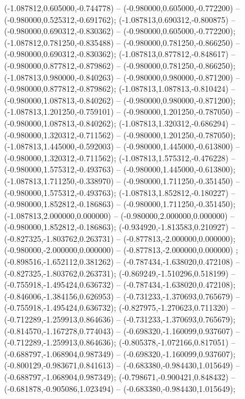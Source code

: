  (-1.087812,0.605000,-0.744778) -- (-0.980000,0.605000,-0.772200) -- (-0.980000,0.525312,-0.691762);
 (-1.087813,0.690312,-0.800875) -- (-0.980000,0.690312,-0.830362) -- (-0.980000,0.605000,-0.772200);
 (-1.087812,0.781250,-0.835488) -- (-0.980000,0.781250,-0.866250) -- (-0.980000,0.690312,-0.830362);
 (-1.087813,0.877812,-0.848617) -- (-0.980000,0.877812,-0.879862) -- (-0.980000,0.781250,-0.866250);
 (-1.087813,0.980000,-0.840263) -- (-0.980000,0.980000,-0.871200) -- (-0.980000,0.877812,-0.879862);
 (-1.087813,1.087813,-0.810424) -- (-0.980000,1.087813,-0.840262) -- (-0.980000,0.980000,-0.871200);
 (-1.087813,1.201250,-0.759101) -- (-0.980000,1.201250,-0.787050) -- (-0.980000,1.087813,-0.840262);
 (-1.087813,1.320312,-0.686294) -- (-0.980000,1.320312,-0.711562) -- (-0.980000,1.201250,-0.787050);
 (-1.087813,1.445000,-0.592003) -- (-0.980000,1.445000,-0.613800) -- (-0.980000,1.320312,-0.711562);
 (-1.087813,1.575312,-0.476228) -- (-0.980000,1.575312,-0.493763) -- (-0.980000,1.445000,-0.613800);
 (-1.087813,1.711250,-0.338970) -- (-0.980000,1.711250,-0.351450) -- (-0.980000,1.575312,-0.493763);
 (-1.087813,1.852812,-0.180227) -- (-0.980000,1.852812,-0.186863) -- (-0.980000,1.711250,-0.351450);
 (-1.087813,2.000000,0.000000) -- (-0.980000,2.000000,0.000000) -- (-0.980000,1.852812,-0.186863);
 (-0.934920,-1.813583,0.210927) -- (-0.827325,-1.803762,0.263731) -- (-0.877813,-2.000000,0.000000);
 (-0.980000,-2.000000,0.000000) -- (-0.877813,-2.000000,0.000000) ;
 (-0.898516,-1.652112,0.381262) -- (-0.787434,-1.638020,0.472108) -- (-0.827325,-1.803762,0.263731);
 (-0.869249,-1.510296,0.518199) -- (-0.755918,-1.495424,0.636732) -- (-0.787434,-1.638020,0.472108);
 (-0.846006,-1.384156,0.626953) -- (-0.731233,-1.370693,0.765679) -- (-0.755918,-1.495424,0.636732);
 (-0.827975,-1.270623,0.711320) -- (-0.712289,-1.259913,0.864636) -- (-0.731233,-1.370693,0.765679);
 (-0.814570,-1.167278,0.774043) -- (-0.698320,-1.160099,0.937607) -- (-0.712289,-1.259913,0.864636);
 (-0.805378,-1.072166,0.817051) -- (-0.688797,-1.068904,0.987349) -- (-0.698320,-1.160099,0.937607);
 (-0.800129,-0.983671,0.841613) -- (-0.683380,-0.984430,1.015649) -- (-0.688797,-1.068904,0.987349);
 (-0.798671,-0.900421,0.848432) -- (-0.681878,-0.905086,1.023494) -- (-0.683380,-0.984430,1.015649);
